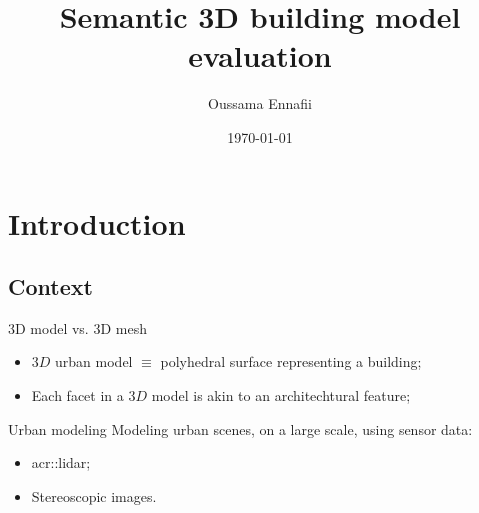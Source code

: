 \documentclass[export]{beamer}
\title{Semantic 3D building model evaluation}
\subtitle{}
\institute[LaSTIG STRUDEL]{Univ. Paris Est, LaSTIG STRUDEL, IGN, ENSG}
\date{\today}
\author[O.Ennafii]{Oussama Ennafii}
\begin{document}
    \begin{frame}[plain]
        \titlepage{}
    \end{frame}

    \section{Introduction}
        \subsection{Context}
            \begin{frame}{3D model vs. 3D mesh}
                \begin{itemize}[label=$\blacktriangleright$, font=\color{IGNGreen}]
                    \item<1-> $3D$ urban model $\equiv$ polyhedral surface representing a building;
                    \item<2-> Each facet in a $3D$ model is akin to an architechtural feature;
                \end{itemize}
            \end{frame}
            \begin{frame}{Urban modeling}
                Modeling urban scenes, on a large scale, using sensor data:
                \begin{itemize}[label=$\blacktriangleright$, font=\color{IGNGreen}]
                    \item \acrfull{acr::lidar};
                    \item Stereoscopic images.
                \end{itemize}
            \end{frame}
\end{document}
